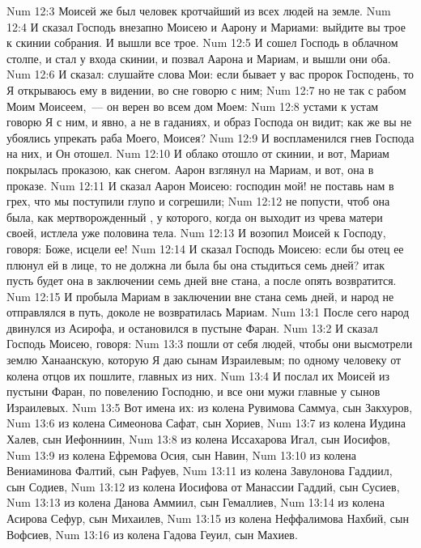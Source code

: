 \vs Num 12:3 Моисей же был человек кротчайший из всех людей на земле.
\rsbpar\vs Num 12:4 И сказал Господь внезапно Моисею и Аарону и Мариами: выйдите вы трое к скинии собрания. И вышли все трое.
\vs Num 12:5 И сошел Господь в облачном столпе, и стал у входа скинии, и позвал Аарона и Мариам, и вышли они оба.
\vs Num 12:6 И сказал: слушайте слова Мои: если бывает у вас пророк Господень, то Я открываюсь ему в видении, во сне говорю с ним;
\vs Num 12:7 но не так с рабом Моим Моисеем,~--- он верен во всем дом Моем:
\vs Num 12:8 устами к устам говорю Я с ним, и явно, а не в гаданиях, и образ Господа он видит; как же вы не убоялись упрекать раба Моего, Моисея?
\vs Num 12:9 И воспламенился гнев Господа на них, и Он отошел.
\vs Num 12:10 И облако отошло от скинии, и вот, Мариам покрылась проказою, как снегом. Аарон взглянул на Мариам, и вот, она в проказе.
\vs Num 12:11 И сказал Аарон Моисею: господин мой! не поставь нам в грех, что мы поступили глупо и согрешили;
\vs Num 12:12 не попусти, чтоб она была, как мертворожденный , у которого, когда он выходит из чрева матери своей, истлела уже половина тела.
\vs Num 12:13 И возопил Моисей к Господу, говоря: Боже, исцели ее!
\vs Num 12:14 И сказал Господь Моисею: если бы отец ее плюнул ей в лице, то не должна ли была бы она стыдиться семь дней? итак пусть будет она в заключении семь дней вне стана, а после опять возвратится.
\vs Num 12:15 И пробыла Мариам в заключении вне стана семь дней, и народ не отправлялся в путь, доколе не возвратилась Мариам.
\vs Num 13:1 После сего народ двинулся из Асирофа, и остановился в пустыне Фаран.
\vs Num 13:2 И сказал Господь Моисею, говоря:
\vs Num 13:3 пошли от себя людей, чтобы они высмотрели землю Ханаанскую, которую Я даю сынам Израилевым; по одному человеку от колена отцов их пошлите, главных из них.
\vs Num 13:4 И послал их Моисей из пустыни Фаран, по повелению Господню, и все они мужи главные у сынов Израилевых.
\vs Num 13:5 Вот имена их: из колена Рувимова Саммуа, сын Закхуров,
\vs Num 13:6 из колена Симеонова Сафат, сын Хориев,
\vs Num 13:7 из колена Иудина Халев, сын Иефонниин,
\vs Num 13:8 из колена Иссахарова Игал, сын Иосифов,
\vs Num 13:9 из колена Ефремова Осия, сын Навин,
\vs Num 13:10 из колена Вениаминова Фалтий, сын Рафуев,
\vs Num 13:11 из колена Завулонова Гаддиил, сын Содиев,
\vs Num 13:12 из колена Иосифова от Манассии Гаддий, сын Сусиев,
\vs Num 13:13 из колена Данова Аммиил, сын Гемаллиев,
\vs Num 13:14 из колена Асирова Сефур, сын Михаилев,
\vs Num 13:15 из колена Неффалимова Нахбий, сын Вофсиев,
\vs Num 13:16 из колена Гадова Геуил, сын Махиев.
